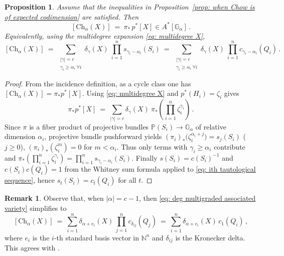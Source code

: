 \documentclass[12pt]{article}
\newtheorem{proposition}[theorem]{Proposition}
\theoremstyle{definition}
\newtheorem{remark}[theorem]{Remark}
\newcommand{\G}{{\mathbb G}}
\newcommand{\PP}{{\mathbb P}}
\begin{document}
\begin{proposition}\label{prop: class of multigraded associated variety}
Assume that the inequalities in Proposition~\ref{prop: when Chow is of expected codimension} are satisfied. Then
\[
    [\mathrm{Ch}_\alpha(X)] \ =\  \pi_*\,p^*[X]\in A^*[\G_\alpha]\,.
\]
Equivalently, using the multidegree expansion \eqref{eq: multidegree X},
\begin{equation}\label{eq: deg multigraded associated variety}
    [\mathrm{Ch}_\alpha(X)]\ =\ \sum_{\substack{|\gamma|=c\\\gamma_i\ge\alpha_i\ \forall i}} \delta_\gamma(X)\ \prod_{i=1}^n s_{\gamma_i-\alpha_i}(S_i)\ =\ \sum_{\substack{|\gamma|=c\\\gamma_i\ge \alpha_i\ \forall i}}\delta_\gamma(X)\ \prod_{i=1}^n c_{\gamma_i-\alpha_i}(Q_i)\,.
\end{equation}
\end{proposition}
\begin{proof}
From the incidence definition, as a cycle class one has $[\mathrm{Ch}_\alpha(X)]=\pi_*p^*[X]$.
Using \eqref{eq: multidegree X} and $p^*(H_i)=\zeta_i$ gives
\[
    \pi_*p^*[X]\ =\ \sum_{|\gamma|=c}\delta_\gamma(X)\ \pi_*\!\left(\prod_{i=1}^n \zeta_i^{\gamma_i}\right)\,.
\]
Since $\pi$ is a fiber product of projective bundles $\PP(S_i)\to \G_\alpha$ of relative dimension $\alpha_i$, projective bundle pushforward yields $(\pi_i)_*\bigl(\zeta_i^{\alpha_i+j}\bigr)=s_j(S_i)$ ($j\ge 0$), $(\pi_i)_*(\zeta_i^m)=0$ for $m<\alpha_i$.
Thus only terms with $\gamma_i\ge \alpha_i$ contribute and $\pi_*\!\left(\prod_{i=1}^n \zeta_i^{\gamma_i}\right) = \prod_{i=1}^n s_{\gamma_i-\alpha_i}(S_i)$.
Finally $s(S_i)=c(S_i)^{-1}$ and $c(S_i)c(Q_i)=1$ from the Whitney sum formula applied to \eqref{eq: ith tautological sequence}, hence $s_{t}(S_i)=c_t(Q_i)$ for all $t$.
\end{proof}

\begin{remark}
Observe that, when $|\alpha|=c-1$, then \eqref{eq: deg multigraded associated variety} simplifies to
\[
    [\mathrm{Ch}_\alpha(X)]\ =\ \sum_{i=1}^n \delta_{\alpha+e_i}(X)\,\prod_{j=1}^n c_{\delta_{ij}}(Q_j)\ =\ \sum_{i=1}^n \delta_{\alpha+e_i}(X)\,c_1(Q_i)\,,
\]
where $e_i$ is the $i$-th standard basis vector in $\mathbb{N}^n$ and $\delta_{ij}$ is the Kronecker delta. This agrees with \cite[Theorem 1.2]{osserman2019multigraded}.
\end{remark}
\end{document}
